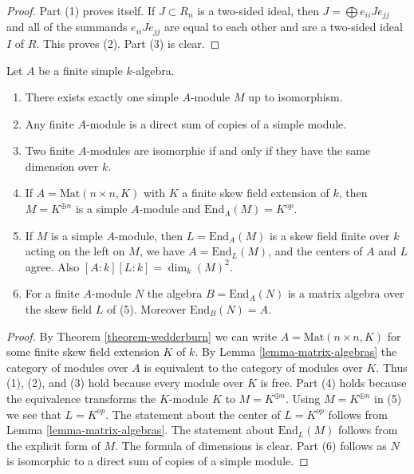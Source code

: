 \begin{proof}
Part (1) proves itself. If $J \subset R_n$ is a two-sided ideal, then
$J = \bigoplus e_{ii}Je_{jj}$ and all of the summands $e_{ii}Je_{jj}$ are
equal to each other and are a two-sided ideal $I$ of $R$. This proves (2).
Part (3) is clear.
\end{proof}

\begin{lemma}
\label{lemma-simple-module-unique}
Let $A$ be a finite simple $k$-algebra.
\begin{enumerate}
\item There exists exactly one simple $A$-module $M$ up to isomorphism.
\item Any finite $A$-module is a direct sum of copies of a simple module.
\item Two finite $A$-modules are isomorphic if and only if they
have the same dimension over $k$.
\item If $A = \text{Mat}(n \times n, K)$ with $K$ a finite skew field
extension of $k$, then $M = K^{\oplus n}$ is a simple $A$-module and
$\text{End}_A(M) = K^{op}$.
\item If $M$ is a simple $A$-module, then $L = \text{End}_A(M)$
is a skew field finite over $k$ acting on the left on $M$, we have
$A = \text{End}_L(M)$, and the centers of $A$ and $L$ agree.
Also $[A : k] [L : k] = \dim_k(M)^2$.
\item For a finite $A$-module $N$ the algebra $B = \text{End}_A(N)$ is a
matrix algebra over the skew field $L$ of (5). Moreover $\text{End}_B(N) = A$.
\end{enumerate}
\end{lemma}

\begin{proof}
By
Theorem \ref{theorem-wedderburn}
we can write $A = \text{Mat}(n \times n, K)$ for some finite skew
field extension $K$ of $k$. By
Lemma \ref{lemma-matrix-algebras}
the category of modules over $A$ is equivalent to the category of
modules over $K$. Thus (1), (2), and (3) hold
because every module over $K$ is free. Part (4) holds
because the equivalence transforms the $K$-module $K$
to $M = K^{\oplus n}$. Using $M = K^{\oplus n}$ in (5)
we see that $L = K^{op}$. The statement about the center of $L = K^{op}$
follows from
Lemma \ref{lemma-matrix-algebras}.
The statement about $\text{End}_L(M)$ follows from the explicit form
of $M$. The formula of dimensions is clear.
Part (6) follows as $N$ is isomorphic to a direct sum of
copies of a simple module.
\end{proof}

